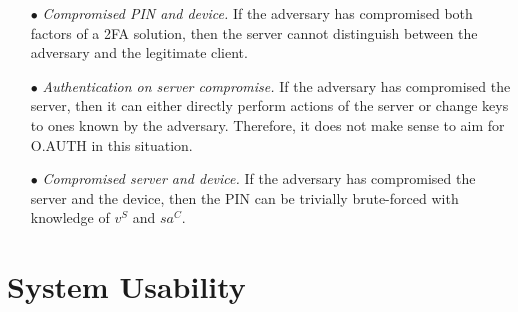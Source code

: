 \documentclass[runningheads]{llncs}
\newcommand{\sss}{\scriptscriptstyle}
\newcommand{\salt}{\ensuremath{{sa}}}
\renewcommand{\verifier}{\ensuremath{{v}}}
\newcommand{\VC}[1]{\ensuremath{#1^{\sss C}}}
\newcommand{\VS}[1]{\ensuremath{#1^{\sss S}}}
\begin{document}
\begin{itemize}
\item[$\bullet$]\textit{Compromised PIN and device.}
If the adversary has compromised both factors of a 2FA solution, then the server cannot distinguish between the adversary and the legitimate client.

\item[$\bullet$]\textit{Authentication on server compromise.}
If the adversary has compromised the server, then it can either directly perform actions of the server or change keys to ones known by the adversary. Therefore, it does not make sense to aim for O.AUTH in this situation.

\item[$\bullet$]\textit{Compromised server and device.}
If the adversary has compromised the server and the device, then the PIN can be trivially brute-forced with knowledge of \VS{\verifier} and \VC{\salt}. %
\end{itemize}





\vspace{-5mm}
\section{System Usability}
\label{sec:asymmetric}



%
\end{document}
